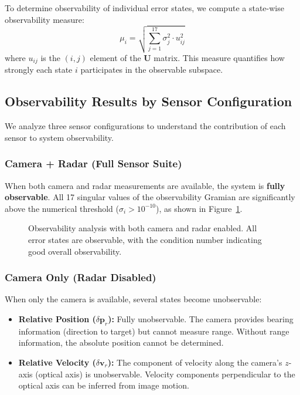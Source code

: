 \documentclass[11pt,a4paper]{article}
\newcommand{\pr}{\mathbf{p}_r}
\newcommand{\vr}{\mathbf{v}_r}
\begin{document}
To determine observability of individual error states, we compute a state-wise observability measure:
\begin{equation}
    \mu_i = \sqrt{\sum_{j=1}^{17} \sigma_j^2 \cdot u_{ij}^2}
\end{equation}
where $u_{ij}$ is the $(i,j)$ element of the $\mathbf{U}$ matrix. This measure quantifies how strongly each state $i$ participates in the observable subspace.

\subsection{Observability Results by Sensor Configuration}

We analyze three sensor configurations to understand the contribution of each sensor to system observability.

\subsubsection{Camera + Radar (Full Sensor Suite)}

When both camera and radar measurements are available, the system is \textbf{fully observable}. All 17 singular values of the observability Gramian are significantly above the numerical threshold ($\sigma_i > 10^{-10}$), as shown in Figure~\ref{fig:obs_full}.

\begin{figure}[h]
    \centering
    \caption{Observability analysis with both camera and radar enabled. All error states are observable, with the condition number indicating good overall observability.}
    \label{fig:obs_full}
\end{figure}

\subsubsection{Camera Only (Radar Disabled)}

When only the camera is available, several states become unobservable:
\begin{itemize}
    \item \textbf{Relative Position ($\delta\pr$):} Fully unobservable. The camera provides bearing information (direction to target) but cannot measure range. Without range information, the absolute position cannot be determined.
    \item \textbf{Relative Velocity ($\delta\vr$):} The component of velocity along the camera's $z$-axis (optical axis) is unobservable. Velocity components perpendicular to the optical axis can be inferred from image motion.
\end{itemize}
\end{document}
